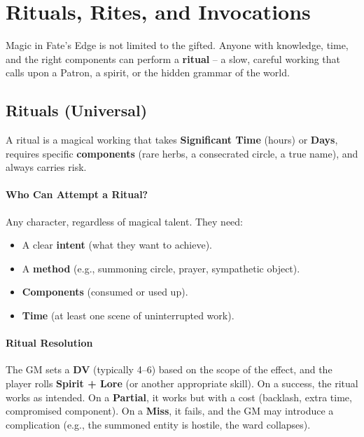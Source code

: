 \section{Rituals, Rites, and Invocations}
\label{sec:rites}

Magic in Fate's Edge is not limited to the gifted. Anyone with knowledge, time, and the right components can perform a \textbf{ritual} -- a slow, careful working that calls upon a Patron, a spirit, or the hidden grammar of the world.

\subsection{Rituals (Universal)}
\label{subsec:universal-rituals}

A ritual is a magical working that takes \textbf{Significant Time} (hours) or \textbf{Days}, requires specific \textbf{components} (rare herbs, a consecrated circle, a true name), and always carries risk.

\paragraph{Who Can Attempt a Ritual?}
Any character, regardless of magical talent. They need:
\begin{itemize}
  \item A clear \textbf{intent} (what they want to achieve).
  \item A \textbf{method} (e.g., summoning circle, prayer, sympathetic object).
  \item \textbf{Components} (consumed or used up).
  \item \textbf{Time} (at least one scene of uninterrupted work).
\end{itemize}

\paragraph{Ritual Resolution}
The GM sets a \textbf{DV} (typically 4--6) based on the scope of the effect, and the player rolls \textbf{Spirit + Lore} (or another appropriate skill). On a success, the ritual works as intended. On a \textbf{Partial}, it works but with a cost (backlash, extra time, compromised component). On a \textbf{Miss}, it fails, and the GM may introduce a complication (e.g., the summoned entity is hostile, the ward collapses).

